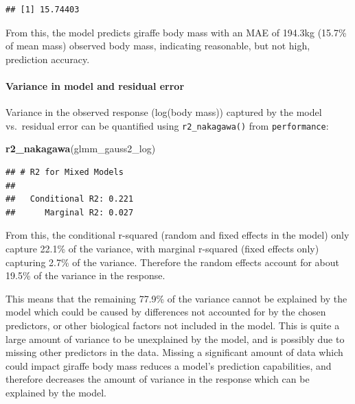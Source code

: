 \documentclass[
]{article}
\newenvironment{Shaded}{\begin{snugshade}}{\end{snugshade}}
\newcommand{\CommentTok}[1]{\textcolor[rgb]{0.56,0.35,0.01}{\textit{#1}}}
\newcommand{\DecValTok}[1]{\textcolor[rgb]{0.00,0.00,0.81}{#1}}
\newcommand{\FunctionTok}[1]{\textcolor[rgb]{0.13,0.29,0.53}{\textbf{#1}}}
\newcommand{\NormalTok}[1]{#1}
\newcommand{\SpecialCharTok}[1]{\textcolor[rgb]{0.81,0.36,0.00}{\textbf{#1}}}
\begin{document}
\begin{Shaded}
\end{Shaded}

\begin{verbatim}
## [1] 15.74403
\end{verbatim}

From this, the model predicts giraffe body mass with an MAE of 194.3kg
(15.7\% of mean mass) observed body mass, indicating reasonable, but not
high, prediction accuracy.

\paragraph{Variance in model and residual
error}\label{variance-in-model-and-residual-error}

Variance in the observed response (log(body mass)) captured by the model
vs.~residual error can be quantified using \texttt{r2\_nakagawa()} from
\texttt{performance}:

\begin{Shaded}
\begin{Highlighting}[]
\FunctionTok{r2\_nakagawa}\NormalTok{(glmm\_gauss2\_log)}
\end{Highlighting}
\end{Shaded}

\begin{verbatim}
## # R2 for Mixed Models
## 
##   Conditional R2: 0.221
##      Marginal R2: 0.027
\end{verbatim}

From this, the conditional r-squared (random and fixed effects in the
model) only capture 22.1\% of the variance, with marginal r-squared
(fixed effects only) capturing 2.7\% of the variance. Therefore the
random effects account for about 19.5\% of the variance in the response.

This means that the remaining 77.9\% of the variance cannot be explained
by the model which could be caused by differences not accounted for by
the chosen predictors, or other biological factors not included in the
model. This is quite a large amount of variance to be unexplained by the
model, and is possibly due to missing other predictors in the data.
Missing a significant amount of data which could impact giraffe body
mass reduces a model's prediction capabilities, and therefore decreases
the amount of variance in the response which can be explained by the
model.
\end{document}
